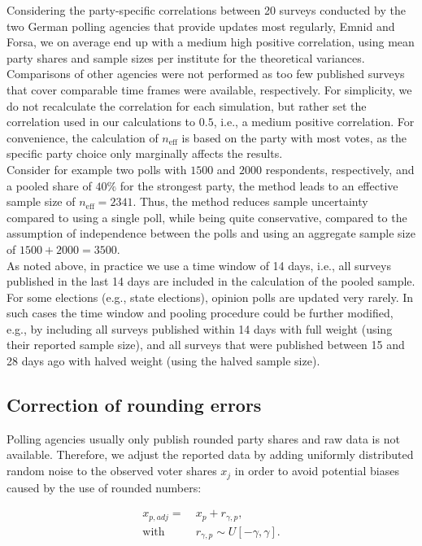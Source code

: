 \documentclass[smallcondensed]{svjour3}     %
\begin{document}
Considering the party-specific correlations between 20 surveys conducted by the
two German polling agencies that provide updates most regularly, Emnid and Forsa,
we on average end up with a medium high positive correlation, using mean party shares and
sample sizes per institute for the theoretical variances. Comparisons of other
agencies were not performed as too few published surveys that
cover comparable time frames were available, respectively. For simplicity, we do
not recalculate the correlation for each simulation, but rather set the correlation
used in our calculations to $0.5$, i.e., a medium positive correlation.
For convenience, the calculation of $n_{\text{eff}}$ is based on the party with
most votes, as the specific party choice only marginally affects the results.\\

Consider for example two polls with $1500$ and $2000$ respondents,
respectively, and a pooled share of $40\%$ for the strongest party, the method
leads to an effective sample size of $n_{\text{eff}} = 2341$. Thus, the method
reduces sample uncertainty compared to using a single poll, while being quite
conservative, compared to the assumption of independence between the polls and using
an aggregate sample size of $1500 + 2000 = 3500$.\\

As noted above, in practice we use a time window of 14 days, i.e., all surveys
published in the last 14 days are included in the calculation of the pooled
sample. For some elections (e.g., state elections), opinion polls are
updated very rarely. In such cases the time window and pooling procedure
could be further modified, e.g., by including all surveys published within 14 days with full
weight (using their reported sample size), and all surveys that were published
between 15 and 28 days ago with halved weight (using the halved sample size).


\subsection{Correction of rounding errors}\label{ssec:rounding}
Polling agencies usually only publish rounded party shares and
raw data is not available. Therefore, we adjust the reported data by adding
uniformly distributed random noise to the observed voter shares $x_j$ in order
to avoid potential biases caused by the use of rounded numbers:

\begin{equation}
\begin{aligned}
x_{p,adj} = \ &x_p + r_{\gamma,p}, \\
\text{with} \ \ \ \ \ &r_{\gamma,p} \sim U[-\gamma,\gamma].
\end{aligned}
\end{equation}
\end{document}
